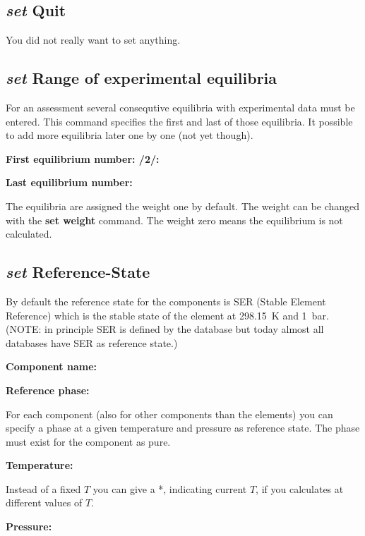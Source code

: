 \documentclass[11pt]{article}
\begin{document}
\hypertarget{Set quit}{}
\subsection{{\em set} Quit}

You did not really want to set anything.

\hypertarget{Set range}{}
\subsection{{\em set} Range of experimental equilibria}\label{sc:setrange}

For an assessment several consequtive equilibria with experimental
data must be entered.  This command specifies the first and last of
those equilibria.  It possible to add more equilibria later one by
one (not yet though).  

\hypertarget{First equilibrium number:}{{\bf First equilibrium number: /2/:}}

{\bf Last equilibrium number:}

The equilibria are assigned the weight one by default.  The weight can
be changed with the {\bf set weight} command.  The weight zero means
the equilibrium is not calculated.

\hypertarget{Set reference phase}{}
\subsection{{\em set} Reference-State}\label{sc:setref}

By default the reference state for the components is SER (Stable
Element Reference) which is the stable state of the element at
298.15~K and 1~bar.  (NOTE: in principle SER is defined by the database
but today almost all databases have SER as reference state.)

{\bf Component name:}

{\bf Reference phase:}

For each component (also for other components than the elements) you
can specify a phase at a given temperature and pressure as reference
state.  The phase must exist for the component as pure.

{\bf Temperature:}

Instead of a fixed $T$ you can give a *, indicating current $T$, if
you calculates at different values of $T$.

{\bf Pressure:}
\end{document}

